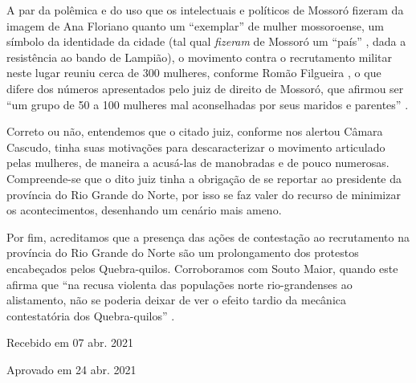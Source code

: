 \begin{refsection}
A par da polêmica e do uso que os intelectuais e políticos de Mossoró fizeram da imagem de Ana Floriano quanto um “exemplar” de mulher mossoroense, um símbolo da identidade da cidade (tal qual \textit{fizeram} de Mossoró um “país” \cite{Carvalho2012}, dada a resistência ao bando de Lampião), o movimento contra o recrutamento militar neste lugar reuniu cerca de 300 mulheres, conforme Romão Filgueira \cite{Rosado1981}, o que difere dos números apresentados pelo juiz de direito de Mossoró, que afirmou ser “um grupo de 50 a 100 mulheres mal aconselhadas por seus maridos e parentes” \cite{Rosado1981}.

Correto ou não, entendemos que o citado juiz, conforme nos alertou Câmara Cascudo, tinha suas motivações para descaracterizar o movimento articulado pelas mulheres, de maneira a acusá-las de manobradas e de pouco numerosas. Compreende-se que o dito juiz tinha a obrigação de se reportar ao presidente da província do Rio Grande do Norte, por isso se faz valer do recurso de minimizar os acontecimentos, desenhando um cenário mais ameno. 

Por fim, acreditamos que a presença das ações de contestação ao recrutamento na província do Rio Grande do Norte são um prolongamento dos protestos encabeçados pelos Quebra-quilos. Corroboramos com Souto Maior, quando este afirma que “na recusa violenta das populações norte rio-grandenses ao alistamento, não se poderia deixar de ver o efeito tardio da mecânica contestatória dos Quebra-quilos” \cite[p.~192]{Maior1978}.

\hfill Recebido em 07 abr. 2021

\hfill Aprovado em 24 abr. 2021

\label{chap:naoaopesoend}

\end{refsection}
